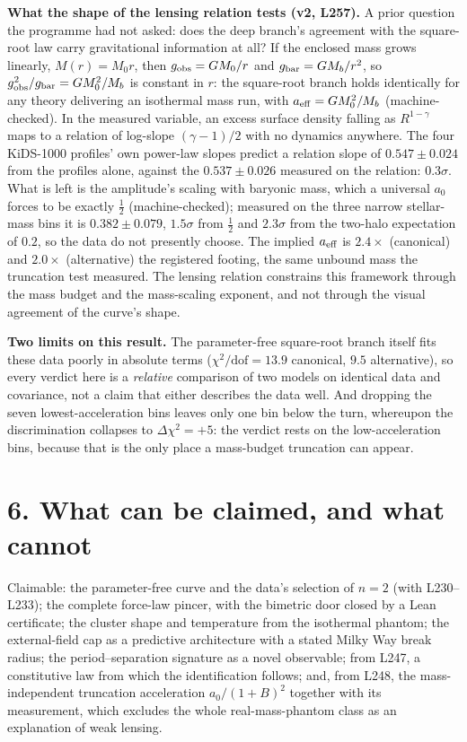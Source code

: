 \documentclass[
  11pt,
]{article}
\begin{document}
\textbf{What the shape of the lensing relation tests (v2, L257).} A
prior question the programme had not asked: does the deep branch's
agreement with the square-root law carry gravitational information at
all? If the enclosed mass grows linearly, \(M(r) = M_0 r\), then
\(g_{\rm obs} = GM_0/r\) and \(g_{\rm bar} = GM_b/r^2\), so
\(g_{\rm obs}^2/g_{\rm bar} = GM_0^2/M_b\) is constant in \(r\): the
square-root branch holds identically for any theory delivering an
isothermal mass run, with \(a_{\rm eff} = GM_0^2/M_b\)
(machine-checked). In the measured variable, an excess surface density
falling as \(R^{1-\gamma}\) maps to a relation of log-slope
\((\gamma-1)/2\) with no dynamics anywhere. The four KiDS-1000 profiles'
own power-law slopes predict a relation slope of \(0.547 \pm 0.024\)
from the profiles alone, against the \(0.537 \pm 0.026\) measured on the
relation: \(0.3\sigma\). What is left is the amplitude's scaling with
baryonic mass, which a universal \(a_0\) forces to be exactly
\(\tfrac12\) (machine-checked); measured on the three narrow
stellar-mass bins it is \(0.382 \pm 0.079\), \(1.5\sigma\) from
\(\tfrac12\) and \(2.3\sigma\) from the two-halo expectation of \(0.2\),
so the data do not presently choose. The implied \(a_{\rm eff}\) is
\(2.4\times\) (canonical) and \(2.0\times\) (alternative) the registered
footing, the same unbound mass the truncation test measured. The lensing
relation constrains this framework through the mass budget and the
mass-scaling exponent, and not through the visual agreement of the
curve's shape.

\textbf{Two limits on this result.} The parameter-free square-root
branch itself fits these data poorly in absolute terms
(\(\chi^2/\mathrm{dof} = 13.9\) canonical, \(9.5\) alternative), so
every verdict here is a \emph{relative} comparison of two models on
identical data and covariance, not a claim that either describes the
data well. And dropping the seven lowest-acceleration bins leaves only
one bin below the turn, whereupon the discrimination collapses to
\(\Delta\chi^2 = +5\): the verdict rests on the low-acceleration bins,
because that is the only place a mass-budget truncation can appear.

\section{6. What can be claimed, and what
cannot}\label{what-can-be-claimed-and-what-cannot}

Claimable: the parameter-free curve and the data's selection of
\(n = 2\) (with L230--L233); the complete force-law pincer, with the
bimetric door closed by a Lean certificate; the cluster shape and
temperature from the isothermal phantom; the external-field cap as a
predictive architecture with a stated Milky Way break radius; the
period--separation signature as a novel observable; from L247, a
constitutive law from which the identification follows; and, from L248,
the mass-independent truncation acceleration \(a_0/(1+B)^2\) together
with its measurement, which excludes the whole real-mass-phantom class
as an explanation of weak lensing.
\end{document}
